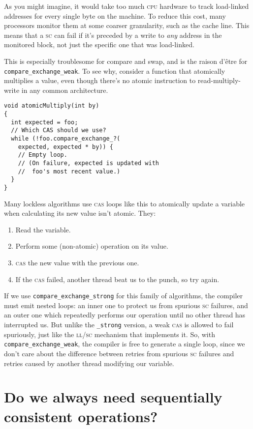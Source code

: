 \documentclass[fontsize=\bodyfontsize, numbers=endperiod]{scrartcl}
\newcommand{\codesize}{\fontsize{\bodyfontsize}{\bodybaselineskip}}
\newcommand{\monobox}[1]{\mbox{\texttt{#1}}}
\newenvironment{colfigure}
  {\par\vspace{1\baselineskip minus 0.5\baselineskip}\noindent\minipage{\linewidth}}
  {\endminipage\vspace{1\baselineskip minus 0.7\baselineskip}}
\begin{document}
\begin{multicols}{2}
As you might imagine, it would take too much \textsc{cpu} hardware to track
load-linked addresses for every single byte on the machine.
To reduce this cost, many processors monitor them at some coarser granularity,
such as the cache line.
This means that a \textsc{sc}
can fail if it's preceded by a write to \emph{any} address in the monitored block,
not just the specific one that was load-linked.

This is especially troublesome for compare and swap,
and is the raison d'être for \monobox{compare\_exchange\_weak}.
To see why, consider a function that atomically multiplies a value,
even though there's no atomic instruction to read-multiply-write in any
common architecture.
\begin{colfigure}
\begin{verbatim}
void atomicMultiply(int by)
{
  int expected = foo;
  // Which CAS should we use?
  while (!foo.compare_exchange_?(
    expected, expected * by)) {
    // Empty loop.
    // (On failure, expected is updated with
    //  foo's most recent value.)
  }
}
\end{verbatim}
\end{colfigure}
Many lockless algorithms use \textsc{cas} loops like this to atomically update
a variable when calculating its new value isn't atomic. They:
\begin{enumerate}
\item Read the variable.
\item Perform some (non-atomic) operation on its value.
\item \textsc{cas} the new value with the previous one.
\item If the \textsc{cas} failed, another thread beat us to the punch,
    so try again.
\end{enumerate}
If we use \monobox{compare\_exchange\_strong} for this family of algorithms,
the compiler must emit nested loops:
an inner one to protect us from spurious \textsc{sc} failures,
and an outer one which repeatedly performs our operation until no other thread
has interrupted us.
But unlike the \monobox{\_strong} version, a weak \textsc{cas}
is allowed to fail spuriously, just like the \textsc{ll/sc} mechanism
that implements it.
So, with \monobox{compare\_exchange\_weak},
the compiler is free to generate a single loop,
since we don't care about the difference between retries from spurious
\textsc{sc} failures and retries caused by another thread modifying our variable.

\section{Do we always need sequentially consistent operations?}
\label{lock-example}


\end{multicols}
\end{document}
